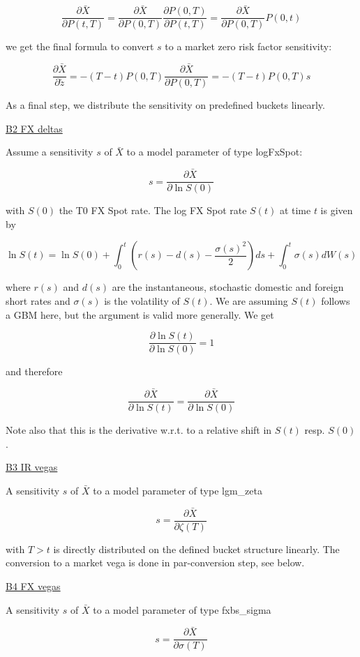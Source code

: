 $$
\frac{\partial \bar{X}}{\partial P(t,T)} = \frac{\partial \bar{X}}{\partial P(0,T)} \frac{\partial P(0,T)}{\partial P(t,T)} =  \frac{\partial \bar{X}}{\partial P(0,T)} P(0,t)
$$

we get the final formula to convert $s$ to a market zero risk factor sensitivity:

$$
\frac{\partial \bar{X}}{\partial{\tilde{z}}} = -(T-t) P(0,T) \frac{\partial \bar{X}}{\partial P(0,T)} = -(T-t) P(0,T) s
$$

As a final step, we distribute the sensitivity on predefined buckets linearly.

\underline{B2  FX deltas}

Assume a sensitivity $s$ of $\bar{X}$ to a model parameter of type logFxSpot:

$$
s = \frac{\partial\bar{X}}{\partial \ln S(0)}
$$

with $S(0)$ the T0 FX Spot rate. The log FX Spot rate $S(t)$ at time $t$ is given by

$$
\ln S(t) = \ln S(0) + \int_0^t \left( r(s) - d(s) - \frac{\sigma(s)^2}{2} \right) ds + \int_0^t \sigma(s) dW(s)
$$

where $r(s)$ and $d(s)$ are the instantaneous, stochastic domestic and foreign short rates and $\sigma(s)$ is the
volatility of $S(t)$. We are assuming $S(t)$ follows a GBM here, but the argument is valid more generally. We get

$$
\frac{\partial \ln S(t)}{\partial \ln S(0)} = 1
$$

and therefore

$$
\frac{\partial \bar{X}}{\partial \ln S(t)} = \frac{\partial \bar{X}}{\partial \ln S(0)}
$$

Note also that this is the derivative w.r.t. to a relative shift in $S(t)$ resp. $S(0)$.

\underline{B3  IR vegas}

A sensitivity $s$ of $\bar{X}$ to a model parameter of type lgm\_zeta

$$
s = \frac{\partial\bar{X}}{\partial \zeta(T)}
$$

with $T>t$ is directly distributed on the defined bucket structure linearly. The conversion to a market vega is done in
par-conversion step, see below.


\underline{B4  FX vegas}

A sensitivity $s$ of $\bar{X}$ to a model parameter of type fxbs\_sigma

$$
s = \frac{\partial\bar{X}}{\partial \sigma(T)}
$$

